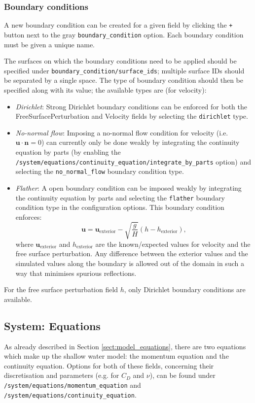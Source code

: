 \documentclass[a4paper,11pt]{report}
\begin{document}
\subsubsection{Boundary conditions}
A new boundary condition can be created for a given field by clicking the \texttt{+} button next to the gray \texttt{boundary\_condition} option. Each boundary condition must be given a unique name.

The surfaces on which the boundary conditions need to be applied should be specified under \texttt{boundary\_condition/surface\_ids}; multiple surface IDs should be separated by a single space. The type of boundary condition should then be specified along with its value; the available types are (for velocity):
\begin{itemize}
   \item \textit{Dirichlet}: Strong Dirichlet boundary conditions can be enforced for both the FreeSurfacePerturbation and Velocity fields by selecting the \texttt{dirichlet} type.
   \item \textit{No-normal flow}: Imposing a no-normal flow condition for velocity (i.e. $\mathbf{u}\cdot\mathbf{n} = 0$) can currently only be done weakly by integrating the continuity equation by parts (by enabling the \texttt{/system/equations/continuity\_equation/integrate\_by\_parts} option) and selecting the \texttt{no\_normal\_flow} boundary condition type.
   \item \textit{Flather}: A \cite{Flather_1976} open boundary condition can be imposed weakly by integrating the continuity equation by parts and selecting the \texttt{flather} boundary condition type in the configuration options. This boundary condition enforces:
   \begin{equation}
      \mathbf{u} = \mathbf{u}_{\mathrm{exterior}} - \sqrt{\frac{g}{H}}\left(h - h_{\mathrm{exterior}}\right),
   \end{equation}
   where $\mathbf{u}_{\mathrm{exterior}}$ and $h_{\mathrm{exterior}}$ are the known/expected values for velocity and the free surface perturbation. Any difference between the exterior values and the simulated values along the boundary is allowed out of the domain in such a way that minimises spurious reflections.
\end{itemize}

For the free surface perturbation field $h$, only Dirichlet boundary conditions are available.

\subsection{System: Equations}
As already described in Section \ref{sect:model_equations}, there are two equations which make up the shallow water model: the momentum equation and the continuity equation. Options for both of these fields, concerning their discretisation and parameters (e.g. for $C_D$ and $\nu$), can be found under \texttt{/system/equations/momentum\_equation} and \texttt{/system/equations/continuity\_equation}.
\end{document}
